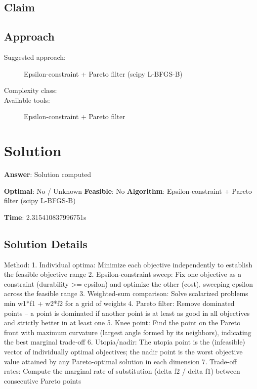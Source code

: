 \documentclass[11pt, a4paper]{article}
\begin{document}
\subsection{Claim}


\subsection{Approach}

\begin{description}
  \item[Suggested approach:] Epsilon-constraint + Pareto filter (scipy L-BFGS-B)
  \item[Complexity class:] 
  \item[Available tools:] Epsilon-constraint + Pareto filter
\end{description}
\section{Solution}

\begin{polyaresult}

\textbf{Answer}: Solution computed


\textbf{Optimal}: No / Unknown \hfill
\textbf{Feasible}: No
\textbf{Algorithm}: Epsilon-constraint + Pareto filter (scipy L-BFGS-B) \quad $$

\textbf{Time}: 2.315410837996751s


\end{polyaresult}

\subsection{Solution Details}


Method: 1. Individual optima: Minimize each objective independently to establish the feasible objective range
2. Epsilon-constraint sweep: Fix one objective as a constraint (durability >= epsilon) and optimize the other (cost), sweeping epsilon across the feasible range
3. Weighted-sum comparison: Solve scalarized problems min w1*f1 + w2*f2 for a grid of weights
4. Pareto filter: Remove dominated points -- a point is dominated if another point is at least as good in all objectives and strictly better in at least one
5. Knee point: Find the point on the Pareto front with maximum curvature (largest angle formed by its neighbors), indicating the best marginal trade-off
6. Utopia/nadir: The utopia point is the (infeasible) vector of individually optimal objectives; the nadir point is the worst objective value attained by any Pareto-optimal solution in each dimension
7. Trade-off rates: Compute the marginal rate of substitution (delta f2 / delta f1) between consecutive Pareto points
\end{document}
